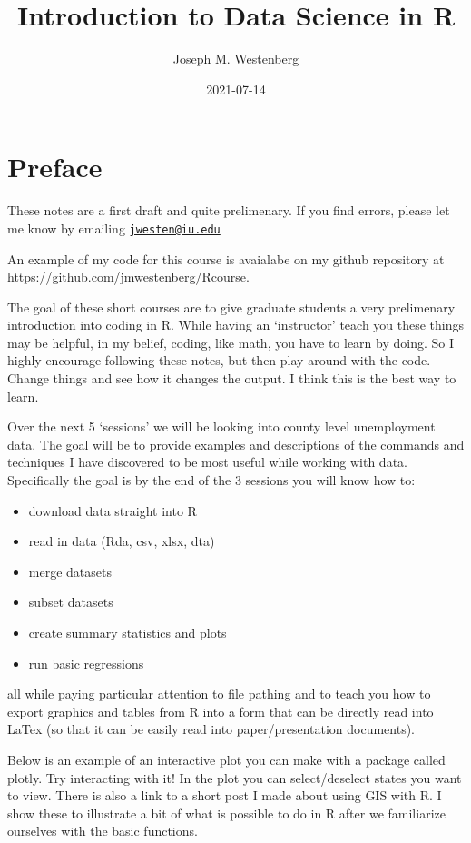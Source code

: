 \documentclass[
]{book}
\title{Introduction to Data Science in R}
\author{Joseph M. Westenberg}
\date{2021-07-14}
\providecommand{\tightlist}{%
  \setlength{\itemsep}{0pt}\setlength{\parskip}{0pt}}
\begin{document}
\maketitle

{
\setcounter{tocdepth}{1}
\tableofcontents
}
\hypertarget{preface}{%
\chapter{Preface}\label{preface}}

These notes are a first draft and quite prelimenary. If you find errors, please let me know by emailing \href{mailto:jwesten@iu.edu}{\nolinkurl{jwesten@iu.edu}}

An example of my code for this course is avaialabe on my github repository at \url{https://github.com/jmwestenberg/Rcourse}.

The goal of these short courses are to give graduate students a very prelimenary introduction into coding in R. While having an `instructor' teach you these things may be helpful, in my belief, coding, like math, you have to learn by doing. So I highly encourage following these notes, but then play around with the code. Change things and see how it changes the output. I think this is the best way to learn.

Over the next 5 `sessions' we will be looking into county level unemployment data. The goal will be to provide examples and descriptions of the commands and techniques I have discovered to be most useful while working with data. Specifically the goal is by the end of the 3 sessions you will know how to:

\begin{itemize}
\tightlist
\item
  download data straight into R
\item
  read in data (Rda, csv, xlsx, dta)
\item
  merge datasets
\item
  subset datasets
\item
  create summary statistics and plots
\item
  run basic regressions
\end{itemize}

all while paying particular attention to file pathing and to teach you how to export graphics and tables from R into a form that can be directly read into LaTex (so that it can be easily read into paper/presentation documents).

Below is an example of an interactive plot you can make with a package called plotly. Try interacting with it! In the plot you can select/deselect states you want to view. There is also a link to a short post I made about using GIS with R. I show these to illustrate a bit of what is possible to do in R after we familiarize ourselves with the basic functions.
\end{document}
